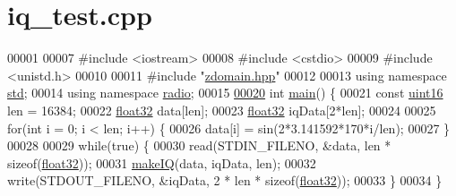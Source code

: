 \hypertarget{iq__test_8cpp_source}{\section{iq\+\_\+test.\+cpp}
\label{iq__test_8cpp_source}
}

\begin{DoxyCode}
00001 
00007 \textcolor{preprocessor}{#include <iostream>}
00008 \textcolor{preprocessor}{#include <cstdio>}
00009 \textcolor{preprocessor}{#include <unistd.h>}
00010 
00011 \textcolor{preprocessor}{#include "\hyperlink{zdomain_8hpp}{zdomain.hpp}"}
00012 
00013 \textcolor{keyword}{using namespace }\hyperlink{namespacestd}{std};
00014 \textcolor{keyword}{using namespace }\hyperlink{namespaceradio}{radio};
00015 
\hypertarget{iq__test_8cpp_source_l00020}{}\hyperlink{iq__test_8cpp_ae66f6b31b5ad750f1fe042a706a4e3d4}{00020} \textcolor{keywordtype}{int} \hyperlink{iq__test_8cpp_ae66f6b31b5ad750f1fe042a706a4e3d4}{main}() \{
00021     \textcolor{keyword}{const} \hyperlink{definitions_8hpp_a05f6b0ae8f6a6e135b0e290c25fe0e4e}{uint16} len = 16384;
00022     \hyperlink{definitions_8hpp_aacdc525d6f7bddb3ae95d5c311bd06a1}{float32} data[len];
00023     \hyperlink{definitions_8hpp_aacdc525d6f7bddb3ae95d5c311bd06a1}{float32} iqData[2*len];
00024 
00025     \textcolor{keywordflow}{for}(\textcolor{keywordtype}{int} i = 0; i < len; i++) \{
00026         data[i] = sin(2*3.141592*170*i/len);
00027     \}
00028 
00029     \textcolor{keywordflow}{while}(\textcolor{keyword}{true}) \{
00030         read(STDIN\_FILENO, &data, len * \textcolor{keyword}{sizeof}(\hyperlink{definitions_8hpp_aacdc525d6f7bddb3ae95d5c311bd06a1}{float32}));
00031         \hyperlink{namespaceradio_a7166522e76ff88e8d482491b1b6e2275}{makeIQ}(data, iqData, len);
00032         write(STDOUT\_FILENO, &iqData,  2 * len * \textcolor{keyword}{sizeof}(\hyperlink{definitions_8hpp_aacdc525d6f7bddb3ae95d5c311bd06a1}{float32}));
00033     \}
00034 \}
\end{DoxyCode}
